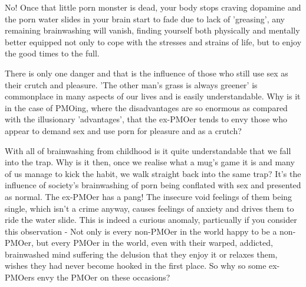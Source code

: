\documentclass[easypeasy.tex]{subfiles}
\begin{document}
No! Once that little porn monster is dead, your body stops craving dopamine and the porn water slides in your brain start to fade due to lack of 'greasing', any remaining brainwashing will vanish, finding yourself both physically and mentally better equipped not only to cope with the stresses and strains of life, but to enjoy the good times to the full.

There is only one danger and that is the influence of those who still use sex as their crutch and pleasure. 'The other man's grass is always greener' is commonplace in many aspects of our lives and is easily understandable. Why is it in the case of PMOing, where the disadvantages are so enormous as compared with the illusionary 'advantages', that the ex-PMOer tends to envy those who appear to demand sex and use porn for pleasure and as a crutch?

With all of brainwashing from childhood is it quite understandable that we fall into the trap. Why is it then, once we realise what a mug's game it is and many of us manage to kick the habit, we walk straight back into the same trap? It's the influence of society's brainwashing of porn being conflated with sex and presented as normal. The ex-PMOer has a pang! The insecure void feelings of them being single, which isn't a crime anyway, causes feelings of anxiety and drives them to ride the water slide. This is indeed a curious anomaly, particually if you consider this observation - Not only is every non-PMOer in the world happy to be a non-PMOer, but every PMOer in the world, even with their warped, addicted, brainwashed mind suffering the delusion that they enjoy it or relaxes them, wishes they had never become hooked in the first place. So why so some ex-PMOers envy the PMOer on these occasions?
\end{document}
